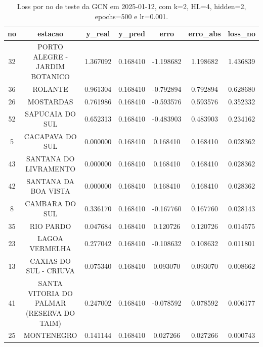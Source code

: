 \begin{table}[h]
\centering
\caption{Loss por no de teste da GCN em 2025-01-12, com k=2, HL=4, hidden=2, epochs=500 e lr=0.001.}
\label{tab:gcn_loss_k2_hl4_h2_e500_d20250112}
\begin{tabular}{ccccccc}
\toprule
no & estacao & y\_real & y\_pred & erro & erro\_abs & loss\_no \\
\midrule
32 & PORTO ALEGRE - JARDIM BOTANICO & 1.367092 & 0.168410 & -1.198682 & 1.198682 & 1.436839 \\
36 & ROLANTE & 0.961304 & 0.168410 & -0.792894 & 0.792894 & 0.628680 \\
26 & MOSTARDAS & 0.761986 & 0.168410 & -0.593576 & 0.593576 & 0.352332 \\
52 & SAPUCAIA DO SUL & 0.652313 & 0.168410 & -0.483903 & 0.483903 & 0.234162 \\
5 & CACAPAVA DO SUL & 0.000000 & 0.168410 & 0.168410 & 0.168410 & 0.028362 \\
43 & SANTANA DO LIVRAMENTO & 0.000000 & 0.168410 & 0.168410 & 0.168410 & 0.028362 \\
42 & SANTANA DA BOA VISTA & 0.000000 & 0.168410 & 0.168410 & 0.168410 & 0.028362 \\
8 & CAMBARA DO SUL & 0.336170 & 0.168410 & -0.167760 & 0.167760 & 0.028143 \\
35 & RIO PARDO & 0.047684 & 0.168410 & 0.120726 & 0.120726 & 0.014575 \\
23 & LAGOA VERMELHA & 0.277042 & 0.168410 & -0.108632 & 0.108632 & 0.011801 \\
13 & CAXIAS DO SUL - CRIUVA & 0.075340 & 0.168410 & 0.093070 & 0.093070 & 0.008662 \\
41 & SANTA VITORIA DO PALMAR (RESERVA DO TAIM) & 0.247002 & 0.168410 & -0.078592 & 0.078592 & 0.006177 \\
25 & MONTENEGRO & 0.141144 & 0.168410 & 0.027266 & 0.027266 & 0.000743 \\
\bottomrule
\end{tabular}
\end{table}
